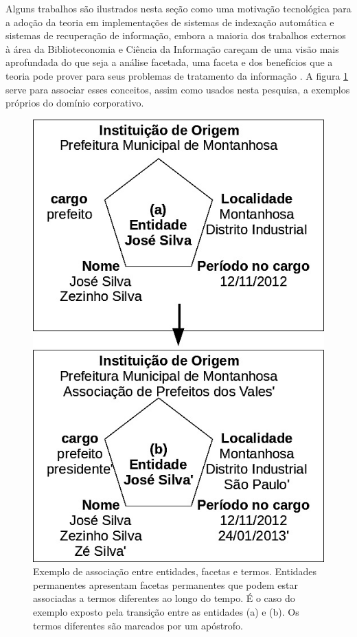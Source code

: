 Alguns trabalhos são ilustrados nesta seção como uma motivação tecnológica para a adoção da teoria em implementações de sistemas de indexação automática e sistemas de recuperação de informação, embora a maioria dos trabalhos externos à área da Biblioteconomia e Ciência da Informação careçam de uma visão mais aprofundada do que seja a análise facetada, uma faceta e dos benefícios que a teoria pode prover para seus problemas de tratamento da informação \cite{labarre2010}. A figura \ref{fig:facetasIndividuo} serve para associar esses conceitos, assim como usados nesta pesquisa, a exemplos próprios do domínio corporativo.




\begin{figure}
	\caption[Exemplo de associação entre entidades, facetas e termos]{\label{fig:facetasIndividuo}Exemplo de associação entre entidades, facetas e termos. Entidades permanentes apresentam facetas permanentes que podem estar associadas a termos diferentes ao longo do tempo. É o caso do exemplo exposto pela transição entre as entidades (a) e (b). Os termos diferentes são marcados por um apóstrofo.}

	\centering
		\includegraphics[width=.60\textwidth]{fig/facetasIndividuo.jpg}

\end{figure}

